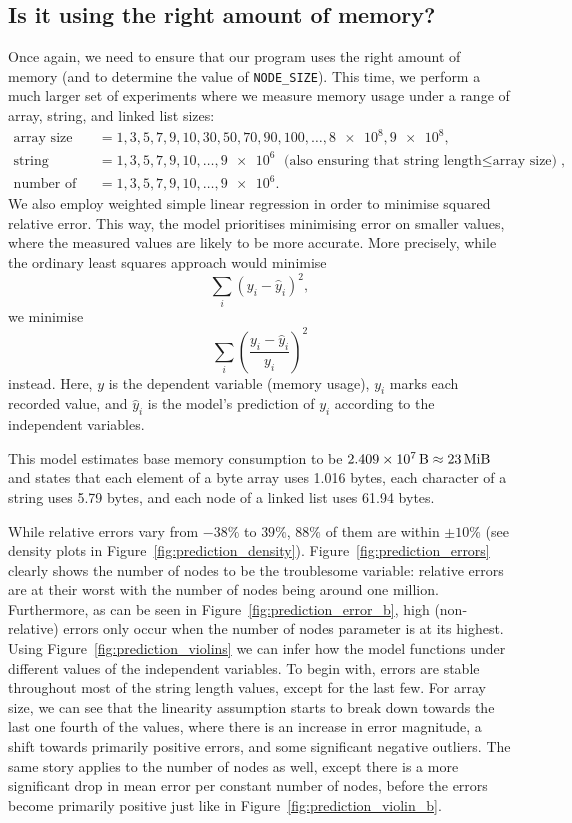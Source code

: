 \documentclass{article}
\begin{document}
\subsection{Is it using the right amount of memory?}

Once again, we need to ensure that our program uses the right amount of
memory (and to determine the value of \texttt{NODE\_SIZE}). This
time, we perform a much larger set of experiments where we measure memory usage
under a range of array, string, and linked list sizes:
\begin{align*}
  \text{array size} &= 1, 3, 5, 7, 9, 10, 30, 50, 70, 90, 100, \dots, \num{8e8}, \num{9e8}, \\
  \text{string length} &= 1, 3, 5, 7, 9, 10, \dots, \num{9e6} \text{ (also ensuring that $\text{string length} \le \text{array size}$)}, \\
  \text{number of nodes} &= 1, 3, 5, 7, 9, 10, \dots, \num{9e6}.
\end{align*}
We also employ weighted simple linear regression in order to minimise squared
relative error. This way, the model prioritises minimising error on smaller
values, where the measured values are likely to be more accurate. More
precisely, while the ordinary least squares approach would minimise
\[
  \sum_i (y_i - \hat{y}_i)^2,
\]
we minimise
\[
  \sum_i \left( \frac{y_i - \hat{y}_i}{y_i} \right)^2
\]
instead. Here, $y$ is the dependent variable (memory usage), $y_i$ marks each
recorded value, and $\hat{y}_i$ is the model's prediction of $y_i$ according to
the independent variables.

This model estimates base memory consumption to be $\SI{2.409e7}{\byte} \approx
\SI{23}{\mebi\byte}$ and states that each element of a byte array uses 1.016
bytes, each character of a string uses 5.79 bytes, and each node of a linked
list uses 61.94 bytes.

While relative errors vary from $-38\%$ to $39\%$, $88\%$ of them are within
$\pm10\%$ (see density plots in Figure~\ref{fig:prediction_density}).
Figure~\ref{fig:prediction_errors} clearly shows the number of nodes to be the
troublesome variable: relative errors are at their worst with the number of
nodes being around one million. Furthermore, as can be seen in
Figure~\ref{fig:prediction_error_b}, high (non-relative) errors only occur when
the number of nodes parameter is at its highest. Using
Figure~\ref{fig:prediction_violins} we can infer how the model functions under
different values of the independent variables. To begin with, errors are stable
throughout most of the string length values, except for the last few. For array
size, we can see that the linearity assumption starts to break down towards the
last one fourth of the values, where there is an increase in error magnitude, a
shift towards primarily positive errors, and some significant negative outliers.
The same story applies to the number of nodes as well, except there is a more
significant drop in mean error per constant number of nodes, before the errors
become primarily positive just like in Figure~\ref{fig:prediction_violin_b}.
\end{document}
